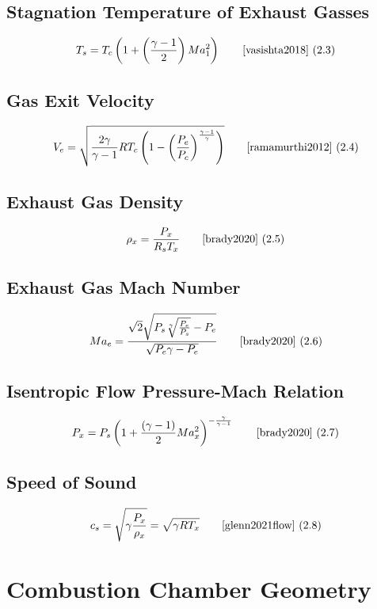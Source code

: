 \documentclass{article}
\newcommand{\eqcite}[3]{\begin{equation}#1\tag*{\text{\cite{#3}~(#2)}}\end{equation}}
\begin{document}
\subsection[Stagnation Temperature]{Stagnation Temperature of Exhaust Gasses}

\eqcite{T_s=T_c\left(1+\left(\frac{\gamma-1}{2}\right)Ma_1^2\right)}{2.3}{vasishta2018}

\subsection[Exit Velocity]{Gas Exit Velocity}

\eqcite{V_e = \sqrt{\frac{2\gamma}{\gamma-1} R T_c \left(1-\left(\frac{P_e}{P_c}\right)^\frac{\gamma-1}{\gamma}\right)}}{2.4}{ramamurthi2012}

\subsection[Exhaust Gas Density]{Exhaust Gas Density}

\eqcite{\rho_x = \frac{P_x}{R_s T_x}}{2.5}{brady2020}

\subsection[Exhaust Gas Mach Number]{Exhaust Gas Mach Number}

\eqcite{Ma_e = \frac{\sqrt{2} \sqrt{P_s\sqrt[\gamma]{\frac{P_e}{P_s}}-P_e}}{\sqrt{P_e \gamma - P_e}}}{2.6}{brady2020}

\subsection{Isentropic Flow Pressure-Mach Relation}

\eqcite{P_x = P_s \left( 1 + \frac{\left(\gamma-1\right)}{2}Ma_x^2\right)^{-\frac{\gamma}{\gamma-1}}}{2.7}{brady2020}

\subsection{Speed of Sound}

\eqcite{c_s = \sqrt{\gamma \frac{P_x}{\rho_x}} = \sqrt{\gamma RT_x}}{2.8}{glenn2021flow}

\pagebreak

\section{Combustion Chamber Geometry}
\end{document}

